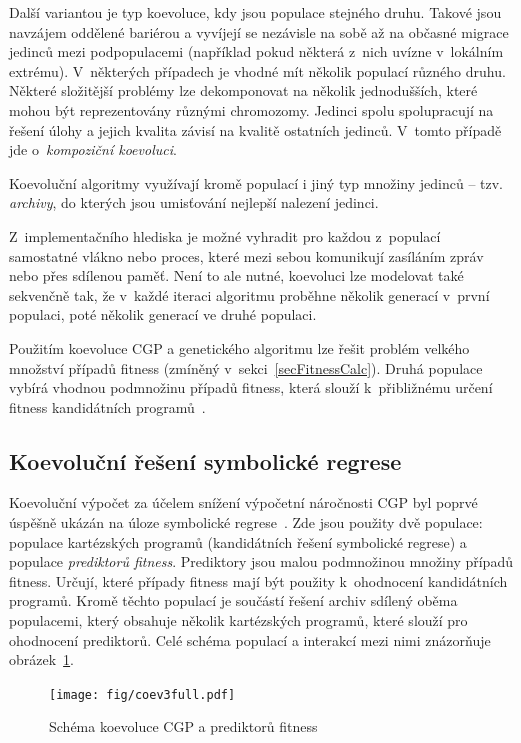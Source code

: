 Další variantou je typ koevoluce, kdy jsou populace stejného druhu. Takové jsou navzájem oddělené bariérou a vyvíjejí se nezávisle na sobě až na občasné migrace jedinců mezi podpopulacemi (například pokud některá z~nich uvízne v~lokálním extrému). V~některých případech je vhodné mít několik populací různého druhu. Některé složitější problémy lze dekomponovat na několik jednodušších, které mohou být reprezentovány různými chromozomy. Jedinci spolu spolupracují na řešení úlohy a jejich kvalita závisí na kvalitě ostatních jedinců. V~tomto případě jde o~\emph{kompoziční koevoluci}.

Koevoluční algoritmy využívají kromě populací i jiný typ množiny jedinců -- tzv. \emph{archivy}, do kterých jsou umisťování nejlepší nalezení jedinci.

Z~implementačního hlediska je možné vyhradit pro každou z~populací samostatné vlákno nebo proces, které mezi sebou komunikují zasíláním zpráv nebo přes sdílenou paměť. Není to ale nutné, koevoluci lze modelovat také sekvenčně tak, že v~každé iteraci algoritmu proběhne několik generací v~první populaci, poté několik generací ve druhé populaci.

Použitím koevoluce CGP a genetického algoritmu lze řešit problém velkého množství případů fitness (zmíněný v~sekci~\ref{secFitnessCalc}). Druhá populace vybírá vhodnou podmnožinu případů fitness, která slouží k~přibližnému určení fitness kandidátních programů~\cite{SikuPPSN}.


\subsection{Koevoluční řešení symbolické regrese}

Koevoluční výpočet za účelem snížení výpočetní náročnosti CGP byl poprvé úspěšně ukázán na úloze symbolické regrese~\cite{SikuEuroGP}. Zde jsou použity dvě populace: populace kartézských programů (kandidátních řešení symbolické regrese) a populace \emph{prediktorů fitness}. Prediktory jsou malou podmnožinou množiny případů fitness. Určují, které případy fitness mají být použity k~ohodnocení kandidátních programů. Kromě těchto populací je součástí řešení archiv sdílený oběma populacemi, který obsahuje několik kartézských programů, které slouží pro ohodnocení prediktorů. Celé schéma populací a interakcí mezi nimi znázorňuje obrázek~\ref{obrKoevoluce}.

\begin{figure}[htb]
    \baselineskip
    \centering\texttt{[image: fig/coev3full.pdf]}
    \caption{Schéma koevoluce CGP a prediktorů fitness~\cite{SikuEuroGP}}
    \label{obrKoevoluce}
\end{figure}

